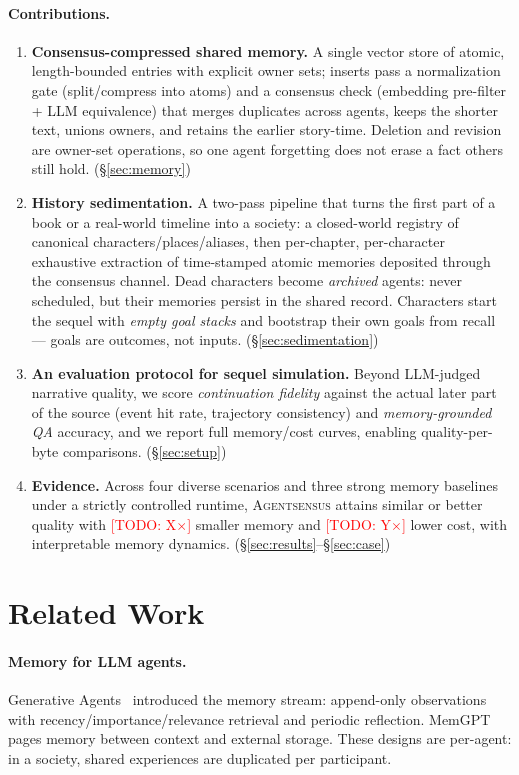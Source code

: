 \documentclass[11pt]{article}
\newcommand{\sysname}{\textsc{Agentsensus}}
\newcommand{\todo}[1]{\textcolor{red}{[TODO: #1]}}
\begin{document}
\paragraph{Contributions.}
\begin{enumerate}
  \item \textbf{Consensus-compressed shared memory.} A single vector store of
  atomic, length-bounded entries with explicit owner sets; inserts pass a
  normalization gate (split/compress into atoms) and a consensus check
  (embedding pre-filter + LLM equivalence) that merges duplicates across
  agents, keeps the shorter text, unions owners, and retains the earlier
  story-time. Deletion and revision are owner-set operations, so one agent
  forgetting does not erase a fact others still hold. (\S\ref{sec:memory})
  \item \textbf{History sedimentation.} A two-pass pipeline that turns the
  first part of a book or a real-world timeline into a society: a closed-world
  registry of canonical characters/places/aliases, then per-chapter,
  per-character exhaustive extraction of time-stamped atomic memories deposited
  through the consensus channel. Dead characters become \emph{archived} agents:
  never scheduled, but their memories persist in the shared record.
  Characters start the sequel with \emph{empty goal stacks} and bootstrap
  their own goals from recall --- goals are outcomes, not inputs.
  (\S\ref{sec:sedimentation})
  \item \textbf{An evaluation protocol for sequel simulation.} Beyond
  LLM-judged narrative quality, we score \emph{continuation fidelity} against
  the actual later part of the source (event hit rate, trajectory consistency)
  and \emph{memory-grounded QA} accuracy, and we report full memory/cost
  curves, enabling quality-per-byte comparisons. (\S\ref{sec:setup})
  \item \textbf{Evidence.} Across four diverse scenarios and three strong
  memory baselines under a strictly controlled runtime, \sysname{} attains
  similar or better quality with \todo{X$\times$} smaller memory and
  \todo{Y$\times$} lower cost, with interpretable memory dynamics.
  (\S\ref{sec:results}--\S\ref{sec:case})
\end{enumerate}

\section{Related Work}
\label{sec:related}

\paragraph{Memory for LLM agents.}
Generative Agents~\cite{park2023generative} introduced the memory stream:
append-only observations with recency/importance/relevance retrieval and
periodic reflection. MemGPT~\cite{packer2023memgpt} pages memory between
context and external storage. These designs are per-agent: in a society,
shared experiences are duplicated per participant.
\end{document}
